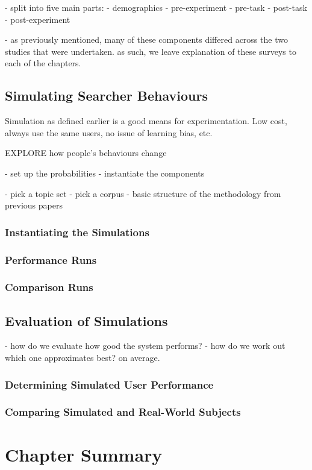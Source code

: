 - split into five main parts:
    - demographics
    - pre-experiment
    - pre-task
    - post-task
    - post-experiment

- as previously mentioned, many of these components differed across the two studies that were undertaken. as such, we leave explanation of these surveys to each of the chapters.

\subsection{Simulating Searcher Behaviours}\label{chap:csm:method:simulation}
Simulation as defined earlier is a good means for experimentation.
Low cost, always use the same users, no issue of learning bias, etc.

EXPLORE how people's behaviours change

- set up the probabilities
- instantiate the components

- pick a topic set
- pick a corpus
- basic structure of the methodology from previous papers

\subsubsection{Instantiating the Simulations}

\subsubsection{Performance Runs}

\subsubsection{Comparison Runs}

\subsection{Evaluation of Simulations}\label{chap:csm:method:evaluation}
- how do we evaluate how good the system performs?
- how do we work out which one approximates best? on average.

\subsubsection{Determining Simulated User Performance}

\subsubsection{Comparing Simulated and Real-World Subjects}

\section{Chapter Summary}